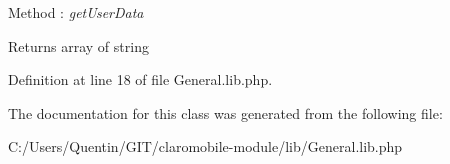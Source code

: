 \begin{DoxyPre}        Method : {\itshape getUserData\/}\end{DoxyPre}


\begin{DoxyReturn}{Returns}
array of string 
\end{DoxyReturn}


Definition at line 18 of file General.lib.php.



The documentation for this class was generated from the following file:\begin{DoxyCompactItemize}
\item 
C:/Users/Quentin/GIT/claromobile-\/module/lib/General.lib.php\end{DoxyCompactItemize}
